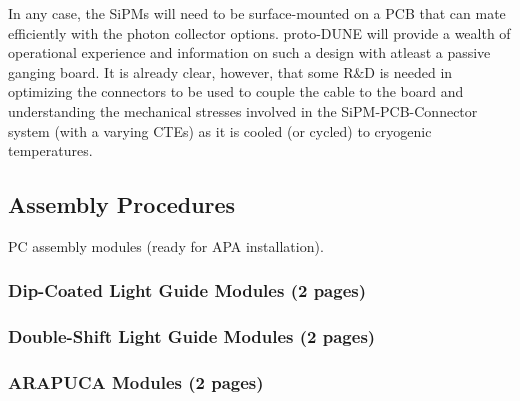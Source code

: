 In any case, the SiPMs will need to be surface-mounted on a PCB that can mate efficiently with the photon
collector options. proto-DUNE will provide a wealth of operational experience and information on
such a design with atleast a passive ganging board. It is already clear, however, that some R$\&$D is needed 
in optimizing the connectors to be used to couple the cable to the board and understanding the 
mechanical stresses involved in the SiPM-PCB-Connector system (with a varying CTEs) as it
is cooled (or cycled) to cryogenic temperatures.





\subsection{Assembly Procedures}
\label{sec:fdsp-pd-assy-ap}

PC assembly modules (ready for APA installation).


\subsubsection{Dip-Coated Light Guide Modules (2 pages)}
\label{ssec:fdsp-pd-pc-assy-bar1}

\subsubsection{Double-Shift Light Guide Modules (2 pages)}
\label{ssec:fdsp-pd-pc-assy-bar2}

\subsubsection{ARAPUCA Modules (2 pages)}
\label{ssec:fdsp-pd-pc-assy-arapuca}


